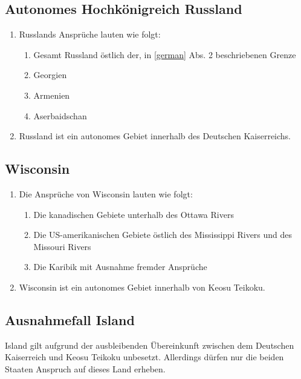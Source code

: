 \documentclass{article}
\begin{document}
\subsection{Autonomes Hochkönigreich Russland}
\begin{enumerate}[(1)]
    \item Russlands Ansprüche lauten wie folgt:
    \begin{enumerate}[1.]
        \item Gesamt Russland östlich der, in \ref{german} Abs. 2 beschriebenen Grenze
        \item Georgien
        \item Armenien
        \item Aserbaidschan
    \end{enumerate}
    \item Russland ist ein autonomes Gebiet innerhalb des Deutschen Kaiserreichs.
\end{enumerate}

\subsection{Wisconsin}
\begin{enumerate}[(1)]
    \item Die Ansprüche von Wisconsin lauten wie folgt:
    \begin{enumerate}[1.]
        \item Die kanadischen Gebiete unterhalb des Ottawa Rivers
        \item Die US-amerikanischen Gebiete östlich des Mississippi Rivers und des Missouri Rivers
        \item Die Karibik mit Ausnahme fremder Ansprüche
    \end{enumerate}
    \item Wisconsin ist ein autonomes Gebiet innerhalb von Keosu Teikoku.
\end{enumerate}

\subsection{Ausnahmefall Island}
Island gilt aufgrund der ausbleibenden Übereinkunft zwischen dem Deutschen Kaiserreich und Keosu Teikoku unbesetzt. Allerdings dürfen nur die beiden
Staaten Anspruch auf dieses Land erheben.
\end{document}
